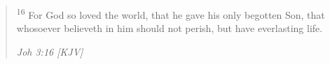 \begin{quote}
\textsuperscript{16} For God so loved the world, that he gave his only begotten Son, that whosoever believeth in him should not perish, but have everlasting life.
\begin{flushright}
\emph{Joh 3:16 [KJV]}
\end{flushright}
\end{quote}